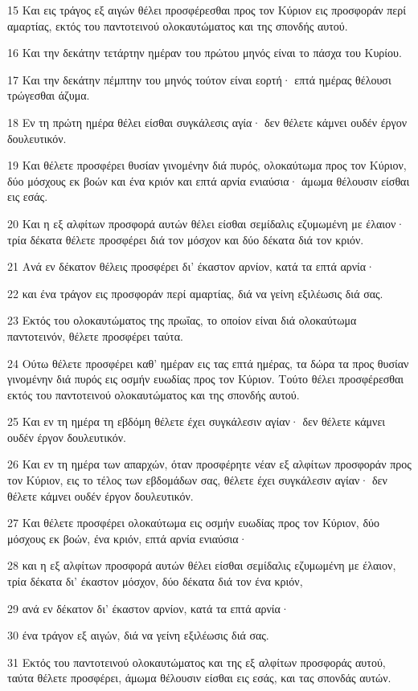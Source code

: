 \par 15 Και εις τράγος εξ αιγών θέλει προσφέρεσθαι προς τον Κύριον εις προσφοράν περί αμαρτίας, εκτός του παντοτεινού ολοκαυτώματος και της σπονδής αυτού.
\par 16 Και την δεκάτην τετάρτην ημέραν του πρώτου μηνός είναι το πάσχα του Κυρίου.
\par 17 Και την δεκάτην πέμπτην του μηνός τούτον είναι εορτή· επτά ημέρας θέλουσι τρώγεσθαι άζυμα.
\par 18 Εν τη πρώτη ημέρα θέλει είσθαι συγκάλεσις αγία· δεν θέλετε κάμνει ουδέν έργον δουλευτικόν.
\par 19 Και θέλετε προσφέρει θυσίαν γινομένην διά πυρός, ολοκαύτωμα προς τον Κύριον, δύο μόσχους εκ βοών και ένα κριόν και επτά αρνία ενιαύσια· άμωμα θέλουσιν είσθαι εις εσάς.
\par 20 Και η εξ αλφίτων προσφορά αυτών θέλει είσθαι σεμίδαλις εζυμωμένη με έλαιον· τρία δέκατα θέλετε προσφέρει διά τον μόσχον και δύο δέκατα διά τον κριόν.
\par 21 Ανά εν δέκατον θέλεις προσφέρει δι' έκαστον αρνίον, κατά τα επτά αρνία·
\par 22 και ένα τράγον εις προσφοράν περί αμαρτίας, διά να γείνη εξιλέωσις διά σας.
\par 23 Εκτός του ολοκαυτώματος της πρωΐας, το οποίον είναι διά ολοκαύτωμα παντοτεινόν, θέλετε προσφέρει ταύτα.
\par 24 Ούτω θέλετε προσφέρει καθ' ημέραν εις τας επτά ημέρας, τα δώρα τα προς θυσίαν γινομένην διά πυρός εις οσμήν ευωδίας προς τον Κύριον. Τούτο θέλει προσφέρεσθαι εκτός του παντοτεινού ολοκαυτώματος και της σπονδής αυτού.
\par 25 Και εν τη ημέρα τη εβδόμη θέλετε έχει συγκάλεσιν αγίαν· δεν θέλετε κάμνει ουδέν έργον δουλευτικόν.
\par 26 Και εν τη ημέρα των απαρχών, όταν προσφέρητε νέαν εξ αλφίτων προσφοράν προς τον Κύριον, εις το τέλος των εβδομάδων σας, θέλετε έχει συγκάλεσιν αγίαν· δεν θέλετε κάμνει ουδέν έργον δουλευτικόν.
\par 27 Και θέλετε προσφέρει ολοκαύτωμα εις οσμήν ευωδίας προς τον Κύριον, δύο μόσχους εκ βοών, ένα κριόν, επτά αρνία ενιαύσια·
\par 28 και η εξ αλφίτων προσφορά αυτών θέλει είσθαι σεμίδαλις εζυμωμένη με έλαιον, τρία δέκατα δι' έκαστον μόσχον, δύο δέκατα διά τον ένα κριόν,
\par 29 ανά εν δέκατον δι' έκαστον αρνίον, κατά τα επτά αρνία·
\par 30 ένα τράγον εξ αιγών, διά να γείνη εξιλέωσις διά σας.
\par 31 Εκτός του παντοτεινού ολοκαυτώματος και της εξ αλφίτων προσφοράς αυτού, ταύτα θέλετε προσφέρει, άμωμα θέλουσιν είσθαι εις εσάς, και τας σπονδάς αυτών.

